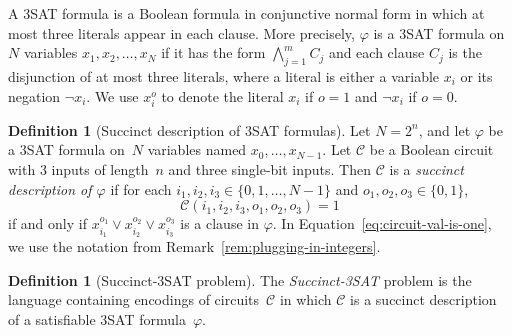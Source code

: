 \documentclass[11pt]{article}
\theoremstyle{definition}
\newtheorem{definition}[theorem]{Definition}
\newcommand{\circuit}{\mathcal{C}}
\begin{document}
A 3SAT formula is a Boolean formula in conjunctive normal form in which at most
three literals appear in each clause.
More precisely, $\varphi$ is a 3SAT formula on $N$ variables $x_1, x_2, \ldots,
x_N$ if it has the form $\bigwedge_{j=1}^m C_j$ and each clause $C_j$ is the
disjunction of at most three literals, where a literal is either a variable
$x_i$ or its negation $\neg x_i$.
We use $x_i^o$ to denote the literal $x_i$ if $o = 1$ and $\neg x_i$ if $o = 0$.

\begin{definition}[Succinct description of 3SAT formulas]
  \label{def:succinct-formulas}
  Let $N = 2^n$, and let $\varphi$ be a 3SAT formula on~$N$ variables named
  $x_0, \ldots, x_{N-1}$.
  Let $\circuit$ be a Boolean circuit with 3 inputs of length~$n$ and three
  single-bit inputs.
  Then $\circuit$ is a \emph{succinct description of $\varphi$} if for each
  $i_1, i_2, i_3 \in \{0, 1, \ldots, N-1\}$ and $o_1, o_2, o_3 \in \{0, 1\}$,
  \begin{equation}\label{eq:circuit-val-is-one}
    \circuit(i_1, i_2, i_3, o_1, o_2, o_3) = 1
  \end{equation}
  if and only if $x_{i_1}^{o_1} \lor x_{i_2}^{o_2} \lor x_{i_3}^{o_3}$ is a
  clause in $\varphi$.
  In Equation~\eqref{eq:circuit-val-is-one}, we use the notation from
  Remark~\ref{rem:plugging-in-integers}.
\end{definition}
  
\begin{definition}[Succinct-3SAT problem]
  The \emph{Succinct-3SAT} problem is the language containing encodings of
  circuits~$\circuit$ in which $\circuit$ is a succinct description of a
  satisfiable 3SAT formula~$\varphi$.
\end{definition}
\end{document}
